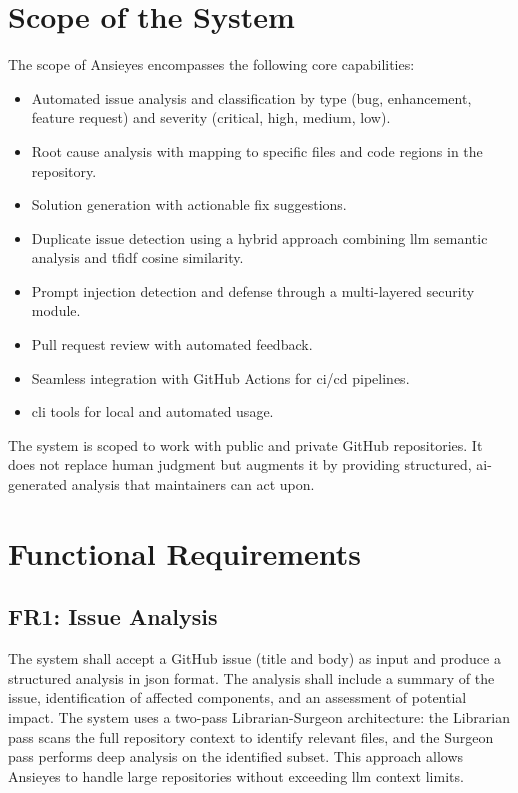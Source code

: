 \section{Scope of the System}

The scope of Ansieyes encompasses the following core capabilities:

\begin{itemize}
    \item Automated issue analysis and classification by type (bug, enhancement, feature request) and severity (critical, high, medium, low).
    \item Root cause analysis with mapping to specific files and code regions in the repository.
    \item Solution generation with actionable fix suggestions.
    \item Duplicate issue detection using a hybrid approach combining \gls{llm} semantic analysis and \gls{tfidf} cosine similarity.
    \item Prompt injection detection and defense through a multi-layered security module.
    \item Pull request review with automated feedback.
    \item Seamless integration with GitHub Actions for \gls{ci}/\gls{cd} pipelines.
    \item \gls{cli} tools for local and automated usage.
\end{itemize}

The system is scoped to work with public and private GitHub repositories. It does not replace human judgment but augments it by providing structured, \gls{ai}-generated analysis that maintainers can act upon.

\section{Functional Requirements}

\subsection{FR1: Issue Analysis}

The system shall accept a GitHub issue (title and body) as input and produce a structured analysis in \gls{json} format. The analysis shall include a summary of the issue, identification of affected components, and an assessment of potential impact. The system uses a two-pass Librarian-Surgeon architecture: the Librarian pass scans the full repository context to identify relevant files, and the Surgeon pass performs deep analysis on the identified subset. This approach allows Ansieyes to handle large repositories without exceeding \gls{llm} context limits.

